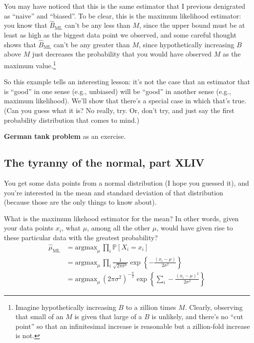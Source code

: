 \documentclass{book}
\begin{document}
You may have noticed that this is the same estimator that I previous
denigrated as ``naive'' and ``biased''. To be clear, this is the maximum
likelihood estimator: you know that \(\hat{B}_\mathrm{ML}\) can't be any
less than \(M\), since the upper bound must be at least as high as the
biggest data point we observed, and some careful thought shows that
\(\hat{B}_\mathrm{ML}\) can't be any greater than \(M\), since
hypothetically increasing \(B\) above \(M\) just decreases the
probability that you would have observed \(M\) as the maximum
value.\footnote{Imagine hypothetically increasing \(B\) to a zillion
  times \(M\). Clearly, observing that small of an \(M\) is given that
  large of a \(B\) is unlikely, and there's no ``cut point'' so that an
  infinitesimal increase is reasonable but a zillion-fold increase is
  not.}

So this example tells an interesting lesson: it's not the case that an
estimator that is ``good'' in one sense (e.g., unbiased) will be
``good'' in another sense (e.g., maximum likelihood). We'll show that
there's a special case in which that's true. (Can you guess what it is?
No really, try. Or, don't try, and just say the first probability
distribution that comes to mind.)

\textbf{German tank problem} as an exercise.

\subsection{The tyranny of the normal, part
XLIV}\label{the-tyranny-of-the-normal-part-xliv}

You get some data points from a normal distribution (I hope you guessed
it), and you're interested in the mean and standard deviation of that
distribution (because those are the only things to know about).

What is the maximum likehood estimator for the mean? In other words,
given your data points \(x_i\), what \(\mu\), among all the other
\(\mu\), would have given rise to these particular data with the
greatest probability? \[
\begin{aligned}
\hat{\mu}_\mathrm{ML}
  &= \mathrm{argmax}_\mu \, \prod_i \mathbb{P}[X_i = x_i] \\
  &= \mathrm{argmax}_\mu \, \prod_i \frac{1}{\sqrt{2 \pi \sigma^2}} \exp\left\{ -\frac{(x_i - \mu)}{2\sigma^2} \right\} \\
  &= \mathrm{argmax}_\mu \, \left(2\pi\sigma^2\right)^{-\frac{n}{2}} \exp\left\{ \sum_i -\frac{(x_i-\mu)^2}{2\sigma^2} \right\}
\end{aligned}
\]
\end{document}
